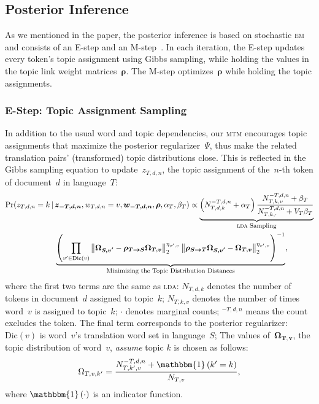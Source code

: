 \documentclass[paper=a4, fontsize=11pt]{article}
\newcommand{\explain}[2]{\underbrace{#2}_{\mbox{\footnotesize{#1}}}}
\newcommand{\lda}{\textsc{lda}\xspace}
\newcommand{\mtm}{\textsc{mtm}\xspace}
\newcommand{\ind}[1]{\mathbbm{1} \left( #1 \right)}
\begin{document}
\subsection{Posterior Inference}

As we mentioned in the paper, the posterior inference is based on stochastic \textsc{em} and consists of an E-step and an M-step~\cite{celeux-1985-sem}. In each iteration, the E-step updates every token's topic assignment using Gibbs sampling, while holding the values in the topic link weight matrices~$\bm{\rho}$. The M-step optimizes~$\bm{\rho}$ while holding the topic assignments.

\subsubsection{E-Step: Topic Assignment Sampling}

In addition to the usual word and topic dependencies, our \mtm encourages topic assignments that maximize the posterior regularizer~$\Psi$, thus make the related translation pairs' (transformed) topic distributions close. This is reflected in the Gibbs sampling equation to update~$z_{T,d,n}$, the topic assignment of the~$n$-th token of document~$d$ in language~$T$:
\begin{align}
\Pr ( z_{T,d,n}=k \,|\, &\bm{z_{-T,d,n}}, w_{T,d,n}=v, \bm{w_{-T,d,n}}, \bm{\rho}, \alpha_T, \beta_T ) \propto \explain{\lda Sampling}{\left( N_{T,d,k}^{-T,d,n}+\alpha_T \right) \frac{N_{T,k,v}^{-T,d,n}+\beta_T}{N_{T,k,\cdot}^{-T,d,n}+V_T\beta_T}} \notag\\
& \explain{Minimizing the Topic Distribution Distances}{\left( \prod_{v' \in \text{Dic} (v)} \left\lVert \bm{\Omega_{S,v'}} - \bm{\rho_{T \rightarrow S} \Omega_{T,v}} \right\rVert_{2}^{\eta_{v',v}} \left\lVert \bm{\rho_{S \rightarrow T} \Omega_{S,v'}} - \bm{\Omega_{T,v}} \right\rVert_{2}^{\eta_{v',v}} \right)^{-1}}, \label{equ:inf_t}
\end{align}
where the first two terms are the same as \lda: $N_{T,d,k}$ denotes the number of tokens in document~$d$ assigned to topic~$k$; $N_{T,k,v}$ denotes the number of times word~$v$ is assigned to topic~$k$; $\cdot$ denotes marginal counts; $^{-T,d,n}$ means the count excludes the token. The final term corresponds to the posterior regularizer: $\text{Dic}(v)$ is word~$v$'s translation word set in language~$S$; The values of~$\bm{\Omega_{T,v}}$, the topic distribution of word~$v$, \emph{assume} topic $k$ is chosen as follows:
\begin{equation}\label{equ:omega_t}
\Omega_{T,v,k'} = \frac{N_{T,k',v}^{-T,d,n} + \ind{k'=k}}{N_{T,v}},
\end{equation}
where $\ind{\cdot}$ is an indicator function.
\end{document}
